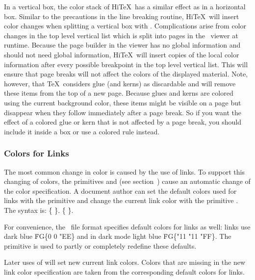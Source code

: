 In a vertical box, the color stack of Hi\TeX\ has a similar effect as in
a horizontal box. Similar to the precautions in the line breaking routine,
Hi\TeX\ will insert color changes when splitting a vertical box with .
Complications arise from color changes in the top level vertical list
which is split into pages in the \HINT\ viewer at runtime.
Because the page builder in the viewer has no global information and
should not need global information, Hi\TeX\ will insert copies of the
local color information after every possible breakpoint in the top
level vertical list. This will ensure that page breaks will not
affect the colors of the displayed material.
Note, however, that \TeX\ considers glue (and kerns) as discardable
and will remove these items from the top of a new page. Because glues and kerns
are colored using the current background color, these items might be visible
on a page but disappear when they follow immediately after a page break.
So if you want the effect of a colored glue or kern that is not affected by
a page break, you should include it inside a box or use a colored rule instead.

\subsubsection{Colors for Links}
The most common change in color is caused by the use of links.
To support this changing of colors, the primitives
and 
(see section~)
cause an automatic change of the color specification.
A document author can set the default colors used for links
with the  primitive  and change
the current link color with the primitive .
The syntax is:
\medskip
\prim{} \.{\{}  \.{\}}.
\prim{} \.{\{}  \.{\}}.
\medskip

For convenience, the \HINT\ file format specifies default colors
for links as well: links use dark blue \.{FG\{0 0 "EE\}} and in dark mode
light blue \.{FG\{"11 "11 "FF\}}.
The primitive  is used
to partly or completely redefine these defaults.

Later uses of  will set new current link colors.
Colors that are missing in the new link color specification are taken
from the corresponding default colors for links.

